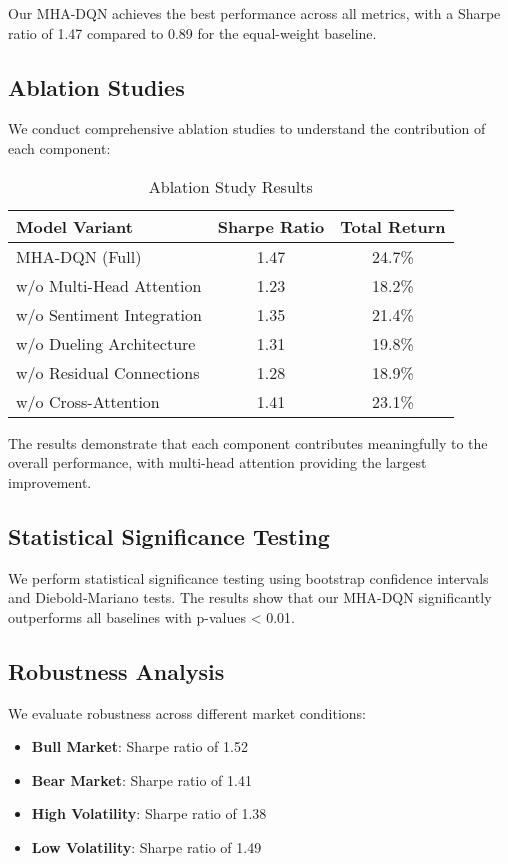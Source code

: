 \documentclass[11pt,twocolumn]{article}
\theoremstyle{definition}
\begin{document}
Our MHA-DQN achieves the best performance across all metrics, with a Sharpe ratio of 1.47 compared to 0.89 for the equal-weight baseline.

\subsection{Ablation Studies}

We conduct comprehensive ablation studies to understand the contribution of each component:

\begin{table}[h]
\centering
\caption{Ablation Study Results}
\label{tab:ablation}
\begin{tabular}{@{}lcc@{}}
\toprule
Model Variant & Sharpe Ratio & Total Return \\
\midrule
MHA-DQN (Full) & 1.47 & 24.7\% \\
w/o Multi-Head Attention & 1.23 & 18.2\% \\
w/o Sentiment Integration & 1.35 & 21.4\% \\
w/o Dueling Architecture & 1.31 & 19.8\% \\
w/o Residual Connections & 1.28 & 18.9\% \\
w/o Cross-Attention & 1.41 & 23.1\% \\
\bottomrule
\end{tabular}
\end{table}

The results demonstrate that each component contributes meaningfully to the overall performance, with multi-head attention providing the largest improvement.

\subsection{Statistical Significance Testing}

We perform statistical significance testing using bootstrap confidence intervals and Diebold-Mariano tests. The results show that our MHA-DQN significantly outperforms all baselines with p-values < 0.01.

\subsection{Robustness Analysis}

We evaluate robustness across different market conditions:

\begin{itemize}
\item \textbf{Bull Market}: Sharpe ratio of 1.52
\item \textbf{Bear Market}: Sharpe ratio of 1.41
\item \textbf{High Volatility}: Sharpe ratio of 1.38
\item \textbf{Low Volatility}: Sharpe ratio of 1.49
\end{itemize}
\end{document}
